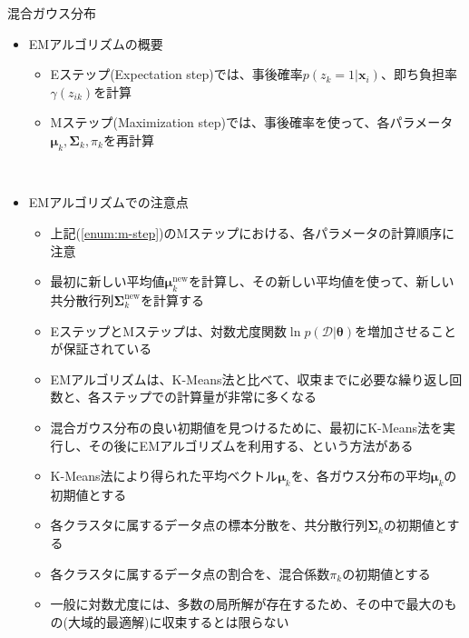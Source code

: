 \documentclass[dvipdfmx,notheorems,t]{beamer}
\begin{document}
\begin{frame}{混合ガウス分布}

\begin{itemize}
	\item EMアルゴリズムの概要
	\begin{itemize}
		\item \alert{Eステップ}(Expectation step)では、事後確率$p(z_k = 1 | \bm{x}_i)$、即ち負担率$\gamma(z_{ik})$を計算
		\item \alert{Mステップ}(Maximization step)では、事後確率を使って、各パラメータ$\bm{\mu}_k, \bm{\Sigma}_k, \pi_k$を再計算
	\end{itemize} \
	
	\item EMアルゴリズムでの注意点
	\begin{itemize}
		\item 上記(\ref{enum:m-step})のMステップにおける、各パラメータの計算順序に注意
		\item 最初に新しい平均値$\bm{\mu}_k^\mathrm{new}$を計算し、\alert{その新しい平均値を使って}、新しい共分散行列$\bm{\Sigma}_k^\mathrm{new}$を計算する
		\newline
		\item EステップとMステップは、\color{red}対数尤度関数$\ln p(\mathcal{D} | \bm{\theta})$を増加させることが保証されている\normalcolor
		\newline
		\item EMアルゴリズムは、K-Means法と比べて、収束までに必要な繰り返し回数と、各ステップでの計算量が非常に多くなる
		\item 混合ガウス分布の良い初期値を見つけるために、最初にK-Means法を実行し、その後にEMアルゴリズムを利用する、という方法がある
		\newline
		\item K-Means法により得られた平均ベクトル$\bm{\mu}_k$を、各ガウス分布の平均$\bm{\mu}_k$の初期値とする
		\item 各クラスタに属するデータ点の\alert{標本分散}を、共分散行列$\bm{\Sigma}_k$の初期値とする
		\item 各クラスタに属するデータ点の\alert{割合}を、混合係数$\pi_k$の初期値とする
		\newline
		\item 一般に対数尤度には、多数の局所解が存在するため、\alert{その中で最大のもの(大域的最適解)に収束するとは限らない}
	\end{itemize}
\end{itemize}

\end{frame}
\end{document}
